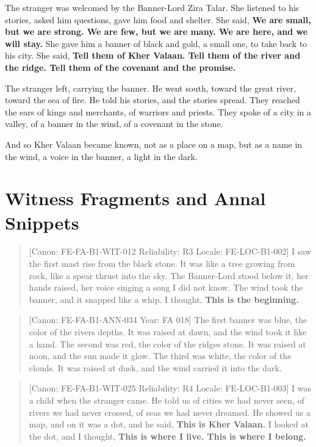 The stranger was welcomed by the Banner-Lord Zira Talar. She listened to
his stories, asked him questions, gave him food and shelter. She said,
\textbf{We are small, but we are strong. We are few, but we are many. We
are here, and we will stay.} She gave him a banner of black and gold, a
small one, to take back to his city. She said, \textbf{Tell them of Kher
Valaan. Tell them of the river and the ridge. Tell them of the covenant
and the promise.}

The stranger left, carrying the banner. He went south, toward the great
river, toward the sea of fire. He told his stories, and the stories
spread. They reached the ears of kings and merchants, of warriors and
priests. They spoke of a city in a valley, of a banner in the wind, of a
covenant in the stone.

And so Kher Valaan became known, not as a place on a map, but as a name
in the wind, a voice in the banner, a light in the dark.

\section{Witness Fragments and Annal
Snippets}\label{witness-fragments-and-annal-snippets}

\begin{quote}
{[}Canon: FE-FA-B1-WIT-012 \textbar{} Reliability: R3 \textbar{} Locale:
FE-LOC-B1-002{]} I saw the first mast rise from the black stone. It was
like a tree growing from rock, like a spear thrust into the sky. The
Banner-Lord stood below it, her hands raised, her voice singing a song I
did not know. The wind took the banner, and it snapped like a whip. I
thought, \textbf{This is the beginning.}
\end{quote}

\begin{quote}
{[}Canon: FE-FA-B1-ANN-034 \textbar{} Year: FA 018{]} The first banner
was blue, the color of the river\textquotesingle s depths. It was raised
at dawn, and the wind took it like a hand. The second was red, the color
of the ridge\textquotesingle s stone. It was raised at noon, and the sun
made it glow. The third was white, the color of the clouds. It was
raised at dusk, and the wind carried it into the dark.
\end{quote}

\begin{quote}
{[}Canon: FE-FA-B1-WIT-025 \textbar{} Reliability: R4 \textbar{} Locale:
FE-LOC-B1-003{]} I was a child when the stranger came. He told us of
cities we had never seen, of rivers we had never crossed, of seas we had
never dreamed. He showed us a map, and on it was a dot, and he said,
\textbf{This is Kher Valaan.} I looked at the dot, and I thought,
\textbf{This is where I live. This is where I belong.}
\end{quote}

